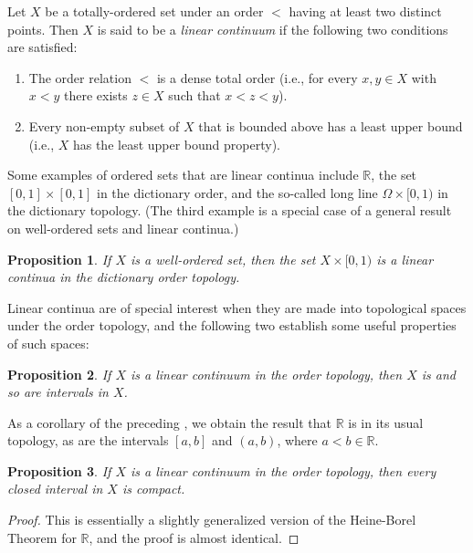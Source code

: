 \documentclass[12pt]{article}
\theoremstyle{plain}
\newtheorem*{proposition*}{Proposition}
\begin{document}
Let $X$ be a totally-ordered set under an order  $<$ having at least two distinct points. Then $X$ is said to be a \emph{linear continuum} if the following two conditions are satisfied:
\begin{enumerate}
\item The order relation $<$ is a dense total order (i.e., for every $x,y\in X$ with $x<y$ there exists $z\in X$ such that $x<z<y$).
\item Every non-empty subset of $X$ that is bounded above has a least upper bound (i.e., $X$ has the least upper bound property).
\end{enumerate}

Some examples of ordered sets that are linear continua include $\mathbb{R}$, the set $[0,1]\times[0,1]$ in the dictionary order, and the so-called long line $\Omega\times[0,1)$ in the dictionary topology. (The third example is a special case of a general result on well-ordered sets and linear continua.)

\begin{proposition*}
If $X$ is a well-ordered set, then the set $X\times[0,1)$ is a linear continua in the dictionary order topology.
\end{proposition*}

Linear continua are of special interest when they are made into topological spaces under the order topology, and the following two  establish some useful properties of such spaces:

\begin{proposition*}
If $X$ is a linear continuum in the order topology, then $X$ is  and so are intervals in $X$.
\end{proposition*}

As a corollary of the preceding , we obtain the result that $\mathbb{R}$ is  in its usual topology, as are the intervals $[a,b]$ and $(a,b)$, where $a<b\in\mathbb{R}$. 

\begin{proposition*}
If $X$ is a linear continuum in the order topology, then every closed interval in $X$ is compact.
\end{proposition*}
\begin{proof}
This is essentially a slightly generalized version of the Heine-Borel Theorem for $\mathbb{R}$, and the proof is almost identical.
\end{proof}




\end{document}
